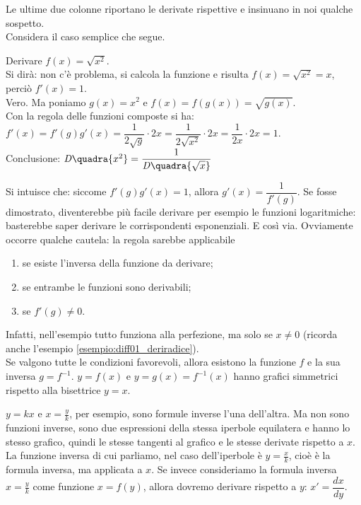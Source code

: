 Le ultime due colonne riportano le derivate rispettive e insinuano in
noi qualche sospetto.\\
Considera il caso semplice che segue.
\begin{esempio}
  Derivare $f(x)=\sqrt{x^2}$.\\
  Si dirà: non c'è problema, si calcola la funzione e risulta 
  $f(x)=\sqrt{x^2}=x$, perciò  $f'(x)=1$. \\
  Vero. Ma poniamo $g(x)=x^2$ e $f(x)=f(g(x))=\sqrt{g(x)}$.\\
  Con la regola delle funzioni composte si ha:\\ 
  $f'(x)=f'(g)g'(x)= \dfrac{1}{2\sqrt{g}}\cdot 2x=
  \dfrac{1}{2\sqrt{x^2}}\cdot 2x=\dfrac{1}{2x}\cdot 2x=1$.\\
  Conclusione: 
$\mathit{D}\quadra{x^2}=\dfrac{1}{\mathit{D}\quadra{\sqrt{x}}}$
\end{esempio}
Si intuisce che: siccome $f'(g)g'(x)=1$, allora $g'(x)=\dfrac{1}{f'(g)}$.
Se fosse dimostrato, diventerebbe più facile derivare per esempio le 
funzioni 
logaritmiche: basterebbe saper derivare le corrispondenti esponenziali. E 
così
via. Ovviamente occorre qualche cautela: la regola sarebbe applicabile
 \begin{enumerate} [noitemsep]
  \item se esiste l'inversa della funzione da derivare;
  \item se entrambe le funzioni sono derivabili;
  \item se  $f'(g)\ne 0$.
 \end{enumerate}
Infatti, nell'esempio tutto funziona alla perfezione, ma solo se $x\ne0$
(ricorda anche l'esempio \ref{esempio:diff01_deriradice}). \\
Se valgono tutte le condizioni favorevoli, allora esistono la funzione
$f$ e la sua inversa $g=f^{-1}$. $y=f(x)$ e $y=g(x)=f^{-1}(x)$ hanno 
grafici 
simmetrici rispetto alla bisettrice $y=x$.
\begin{osservazione}
 $y=kx$ e $x=\frac{y}{k}$, per esempio, sono formule inverse l'una 
 dell'altra. Ma non sono funzioni inverse, sono due espressioni della 
stessa 
 iperbole equilatera e hanno lo stesso grafico, quindi le stesse tangenti al
 grafico e le stesse derivate rispetto a $x$.\\ La funzione inversa di cui 
 parliamo, nel caso dell'iperbole è $y=\frac{x}{k}$, cioè è la formula 
inversa,
 ma applicata a $x$. Se invece consideriamo la formula inversa 
$x=\frac{y}{k}$
 come funzione $x=f(y)$, allora dovremo derivare rispetto a $y$: 
 $x'=\dfrac{dx}{dy}$.
\end{osservazione}

